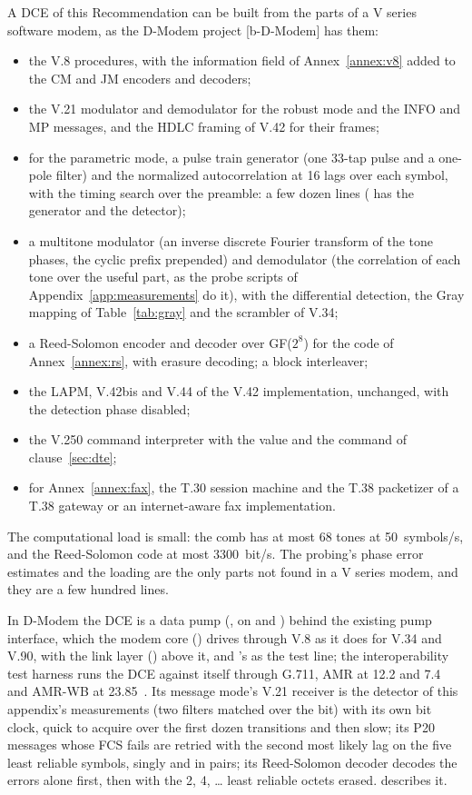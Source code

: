 A DCE of this Recommendation can be built from the parts of a V series
software modem, as the D-Modem project [b-D-Modem] has them:
\begin{itemize}
\item the V.8 procedures, with the information field of
  Annex~\ref{annex:v8} added to the CM and JM encoders and decoders;
\item the V.21 modulator and demodulator for the robust mode and the
  INFO and MP messages, and the HDLC framing of V.42 for their frames;
\item for the parametric mode, a pulse train generator (one 33-tap pulse
  and a one-pole filter) and the normalized autocorrelation at 16 lags
  over each symbol, with the timing search over the preamble: a few
  dozen lines ( has the generator and the
  detector);
\item a multitone modulator (an inverse discrete Fourier transform of
  the tone phases, the cyclic prefix prepended) and demodulator (the
  correlation of each tone over the useful part, as the probe scripts of
  Appendix~\ref{app:measurements} do it), with the differential
  detection, the Gray mapping of Table~\ref{tab:gray} and the scrambler
  of V.34;
\item a Reed-Solomon encoder and decoder over GF($2^8$) for the code of
  Annex~\ref{annex:rs}, with erasure decoding; a block interleaver;
\item the LAPM, V.42bis and V.44 of the V.42 implementation, unchanged,
  with the detection phase disabled;
\item the V.250 command interpreter with the  value and the
   command of clause~\ref{sec:dte};
\item for Annex~\ref{annex:fax}, the T.30 session machine and the T.38
  packetizer of a T.38 gateway or an internet-aware fax implementation.
\end{itemize}
The computational load is small: the comb has at most 68 tones at
50~symbols/s, and the Reed-Solomon code at most 3300~bit/s.  The
probing's phase error estimates and the loading are the only parts not
found in a V series modem, and they are a few hundred lines.

In D-Modem the DCE is a data pump (, on
 and ) behind the existing pump
interface, which the modem core () drives through V.8 as it
does for V.34 and V.90, with the link layer () above it, and
's  as the test line; the interoperability
test harness runs the DCE against itself through G.711, AMR at 12.2 and
7.4~\kbs{} and AMR-WB at 23.85~\kbs{}.  Its message mode's V.21 receiver
is the detector of this appendix's measurements (two filters matched over
the bit) with its own bit clock, quick to acquire over the first dozen
transitions and then slow; its P20 messages whose FCS fails are retried
with the second most likely lag on the five least reliable symbols, singly
and in pairs; its Reed-Solomon decoder decodes the errors alone first,
then with the 2, 4, \ldots{} least reliable octets erased.
 describes it.
